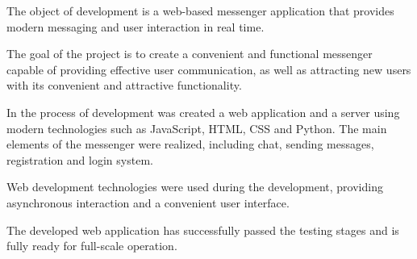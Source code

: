 The object of development is a web-based messenger application that provides modern messaging and user interaction in real time.

The goal of the project is to create a convenient and functional messenger capable of providing effective user communication, as well as attracting new users with its convenient and attractive functionality.

In the process of development was created a web application and a server using modern technologies such as JavaScript, HTML, CSS and Python. The main elements of the messenger were realized, including chat, sending messages, registration and login system.

Web development technologies were used during the development, providing asynchronous interaction and a convenient user interface.

The developed web application has successfully passed the testing stages and is fully ready for full-scale operation.

